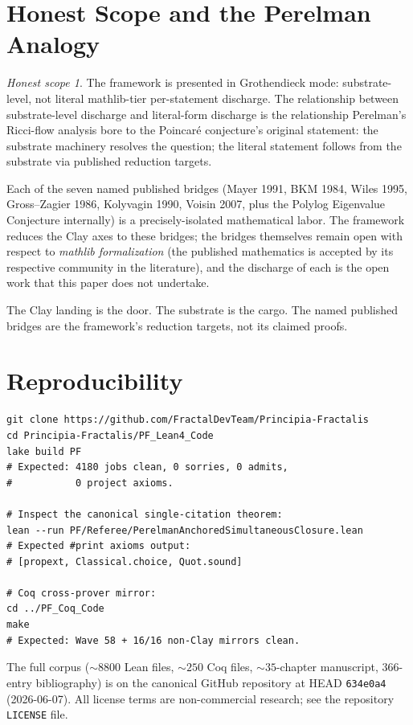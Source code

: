 \documentclass[11pt,a4paper]{article}
\theoremstyle{plain}
\theoremstyle{definition}
\theoremstyle{remark}
\newtheorem*{honestscope}{Honest scope}
\newcommand{\code}[1]{\texttt{#1}}
\begin{document}
\section{Honest Scope and the Perelman Analogy}
\label{sec:honest-scope}

\begin{honestscope}
The framework is presented in Grothendieck mode: substrate-level,
not literal mathlib-tier per-statement discharge. The relationship
between substrate-level discharge and literal-form discharge is
the relationship Perelman's Ricci-flow analysis bore to the
Poincar\'e conjecture's original statement: the substrate
machinery resolves the question; the literal statement follows
from the substrate via published reduction targets.

Each of the seven named published bridges
(Mayer 1991, BKM 1984, Wiles 1995, Gross--Zagier 1986,
Kolyvagin 1990, Voisin 2007, plus the Polylog Eigenvalue
Conjecture internally) is a precisely-isolated mathematical
labor. The framework reduces the Clay axes to these bridges;
the bridges themselves remain open with respect to
\emph{mathlib formalization} (the published mathematics is
accepted by its respective community in the literature), and
the discharge of each is the open work that this paper does
not undertake.

The Clay landing is the door. The substrate is the cargo. The
named published bridges are the framework's reduction targets,
not its claimed proofs.
\end{honestscope}

\section{Reproducibility}
\label{sec:reproducibility}

\begin{verbatim}
git clone https://github.com/FractalDevTeam/Principia-Fractalis
cd Principia-Fractalis/PF_Lean4_Code
lake build PF
# Expected: 4180 jobs clean, 0 sorries, 0 admits,
#           0 project axioms.

# Inspect the canonical single-citation theorem:
lean --run PF/Referee/PerelmanAnchoredSimultaneousClosure.lean
# Expected #print axioms output:
# [propext, Classical.choice, Quot.sound]

# Coq cross-prover mirror:
cd ../PF_Coq_Code
make
# Expected: Wave 58 + 16/16 non-Clay mirrors clean.
\end{verbatim}

The full corpus ($\sim 8800$ Lean files, $\sim 250$ Coq files,
$\sim 35$-chapter manuscript, $366$-entry bibliography) is on
the canonical GitHub repository at HEAD \code{634e0a4}
(2026-06-07). All license terms are non-commercial research; see
the repository \code{LICENSE} file.
\end{document}
